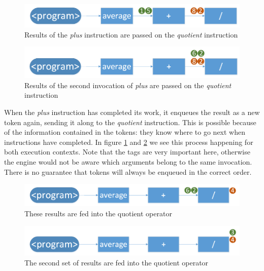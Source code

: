 \begin{figure}[h!]
	\includegraphics[width=\textwidth]{images/Engine-Architecture-4.png}
	\caption{Results of the \textit{plus} instruction are passed on the \textit{quotient} instruction}
	\label{fig:engine-architecture-4}
\end{figure} 

\begin{figure}[h!]
	\includegraphics[width=\textwidth]{images/Engine-Architecture-5.png}
	\caption{Results of the second invocation of \textit{plus} are passed on the \textit{quotient} instruction}
	\label{fig:engine-architecture-5}
\end{figure}

When the \textit{plus} instruction has completed its work, it enqueues the result as a new token again, sending it along to the \textit{quotient} instruction. This is possible because of the information contained in the tokens: they know where to go next when instructions have completed. 
In figure \ref{fig:engine-architecture-4} and \ref{fig:engine-architecture-5} we see this process happening for both execution contexts.
Note that the tags are very important here, otherwise the engine would not be aware which arguments belong to the same invocation. There is no guarantee that tokens will always be enqueued in the correct order.

\begin{figure}[h!]
	\includegraphics[width=\textwidth]{images/Engine-Architecture-6.png}
	\caption{These results are fed into the quotient operator}
	\label{fig:engine-architecture-6}
\end{figure}

\begin{figure}[h!]
	\includegraphics[width=\textwidth]{images/Engine-Architecture-7.png}
	\caption{The second set of results are fed into the quotient operator}
	\label{fig:engine-architecture-7}
\end{figure}

